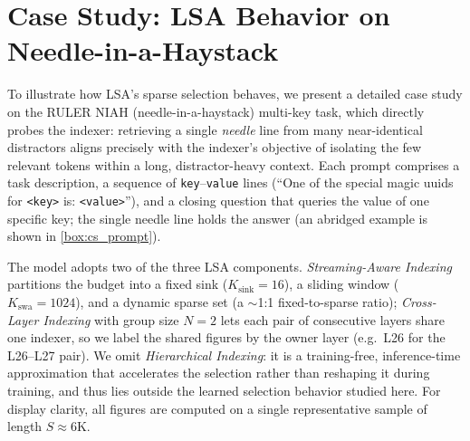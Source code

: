 \documentclass{article}
\begin{document}
\clearpage
\section{Case Study: LSA Behavior on Needle-in-a-Haystack}
\label{app:casestudy}

To illustrate how LSA's sparse selection behaves, we present a detailed case study on the RULER NIAH (needle-in-a-haystack) multi-key task, which directly probes the indexer: retrieving a single \emph{needle} line from many near-identical distractors aligns precisely with the indexer's objective of isolating the few relevant tokens within a long, distractor-heavy context. Each prompt comprises a task description, a sequence of \texttt{key}--\texttt{value} lines (``One of the special magic uuids for \texttt{<key>} is: \texttt{<value>}''), and a closing question that queries the value of one specific key; the single needle line holds the answer (an abridged example is shown in \cref{box:cs_prompt}).

The model adopts two of the three LSA components. \emph{Streaming-Aware Indexing} partitions the budget into a fixed sink ($K_{\text{sink}}{=}16$), a sliding window ($K_{\text{swa}}{=}1024$), and a dynamic sparse set (a $\sim$1:1 fixed-to-sparse ratio); \emph{Cross-Layer Indexing} with group size $N{=}2$ lets each pair of consecutive layers share one indexer, so we label the shared figures by the owner layer (e.g.\ L26 for the L26--L27 pair). We omit \emph{Hierarchical Indexing}: it is a training-free, inference-time approximation that accelerates the selection rather than reshaping it during training, and thus lies outside the learned selection behavior studied here. For display clarity, all figures are computed on a single representative sample of length $S \approx 6$K.
\end{document}
